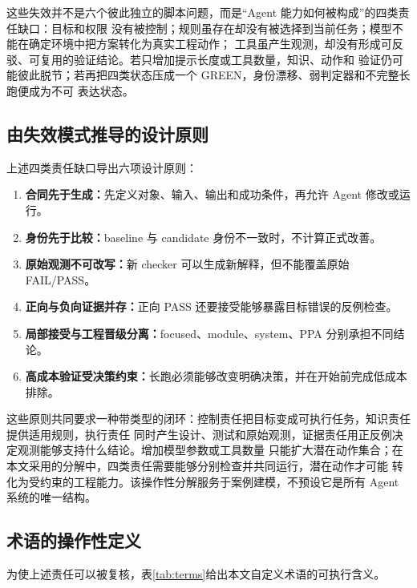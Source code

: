 \documentclass[UTF8,a4paper,zihao=-4,oneside]{ctexart}
\begin{document}
这些失效并不是六个彼此独立的脚本问题，而是“Agent 能力如何被构成”的四类责任缺口：目标和权限
没有被控制；规则虽存在却没有被选择到当前任务；模型不能在确定环境中把方案转化为真实工程动作；
工具虽产生观测，却没有形成可反驳、可复用的验证结论。若只增加提示长度或工具数量，知识、动作和
验证仍可能彼此脱节；若再把四类状态压成一个 GREEN，身份漂移、弱判定器和不完整长跑便成为不可
表达状态。

\subsection{由失效模式推导的设计原则}

上述四类责任缺口导出六项设计原则：

\begin{enumerate}
  \item \textbf{合同先于生成：}先定义对象、输入、输出和成功条件，再允许 Agent 修改或运行。
  \item \textbf{身份先于比较：}baseline 与 candidate 身份不一致时，不计算正式改善。
  \item \textbf{原始观测不可改写：}新 checker 可以生成新解释，但不能覆盖原始 FAIL/PASS。
  \item \textbf{正向与负向证据并存：}正向 PASS 还要接受能够暴露目标错误的反例检查。
  \item \textbf{局部接受与工程晋级分离：}focused、module、system、PPA 分别承担不同结论。
  \item \textbf{高成本验证受决策约束：}长跑必须能够改变明确决策，并在开始前完成低成本排除。
\end{enumerate}

这些原则共同要求一种带类型的闭环：控制责任把目标变成可执行任务，知识责任提供适用规则，执行责任
同时产生设计、测试和原始观测，证据责任用正反例决定观测能够支持什么结论。增加模型参数或工具数量
只能扩大潜在动作集合；在本文采用的分解中，四类责任需要能够分别检查并共同运行，潜在动作才可能
转化为受约束的工程能力。该操作性分解服务于案例建模，不预设它是所有 Agent 系统的唯一结构。

\subsection{术语的操作性定义}

为使上述责任可以被复核，表\ref{tab:terms}给出本文自定义术语的可执行含义。
\end{document}
